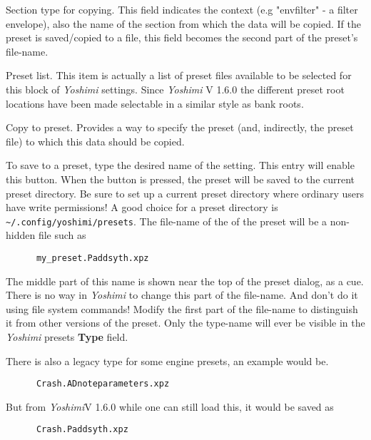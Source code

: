    Section type for copying.
   This field indicates the context (e.g "envfilter" - a filter envelope), also the
   name of the section from which the data will be copied.
   If the preset is saved/copied to a file, this field becomes the second part of
   the preset's file-name.

   Preset list.
   This item is actually a list of preset files available to be selected for
   this block of \textsl{Yoshimi} settings. Since \textsl{Yoshimi} V 1.6.0 the
   different preset root locations have been made selectable in a similar style
   as bank roots.

   Copy to preset.
   Provides a way to specify the preset (and, indirectly, the preset file)
   to which this data should be copied.

   To save to a preset, type the desired name of the setting.  This entry
   will enable this button.  When the button is pressed, the preset will
   be saved to the current preset directory.
   Be sure to set up a current preset directory where ordinary users have
   write permissions!
   A good choice for a preset directory is
   \texttt{\textasciitilde/.config/yoshimi/presets}.
   The file-name of the of the preset will be a non-hidden file such as

   \begin{verbatim}
      my_preset.Paddsyth.xpz
   \end{verbatim}

   The middle part of this name is shown near the top of the preset dialog, as
   a cue.
   There is no way in \textsl{Yoshimi} to change this part of the file-name.
   And don't do it using file system commands!  Modify the first part of the
   file-name to distinguish it from other versions of the preset.
   Only the type-name will ever be visible in the \textsl{Yoshimi}
   presets \textbf{Type} field.

   There is also a legacy type for some engine presets, an example would be.
   \begin{verbatim}
      Crash.ADnoteparameters.xpz
   \end{verbatim}
   But from \textsl{Yoshimi}V 1.6.0 while one can still load this, it would be saved as
   \begin{verbatim}
      Crash.Paddsyth.xpz
   \end{verbatim}

